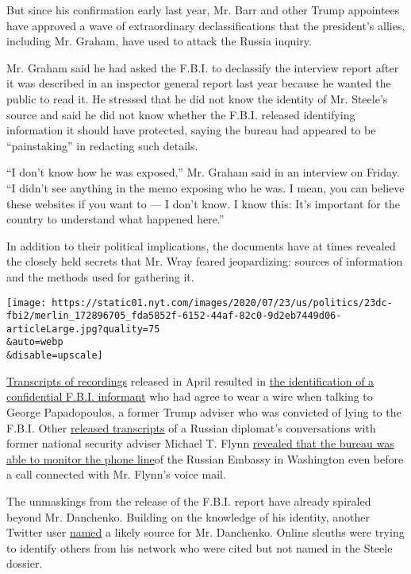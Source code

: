 But since his confirmation early last year, Mr. Barr and other Trump
appointees have approved a wave of extraordinary declassifications that
the president's allies, including Mr. Graham, have used to attack the
Russia inquiry.

Mr. Graham said he had asked the F.B.I. to declassify the interview
report after it was described in an inspector general report last year
because he wanted the public to read it. He stressed that he did not
know the identity of Mr. Steele's source and said he did not know
whether the F.B.I. released identifying information it should have
protected, saying the bureau had appeared to be ``painstaking'' in
redacting such details.

``I don't know how he was exposed,'' Mr. Graham said in an interview on
Friday. ``I didn't see anything in the memo exposing who he was. I mean,
you can believe these websites if you want to --- I don't know. I know
this: It's important for the country to understand what happened here.''

In addition to their political implications, the documents have at times
revealed the closely held secrets that Mr. Wray feared jeopardizing:
sources of information and the methods used for gathering it.

\texttt{[image: https://static01.nyt.com/images/2020/07/23/us/politics/23dc-fbi2/merlin\_172896705\_fda5852f-6152-44af-82c0-9d2eb7449d06-articleLarge.jpg?quality=75\\\&auto=webp\\\&disable=upscale]}

\href{https://www.judiciary.senate.gov/imo/media/doc/2020-04-24\%20Submission\%20SJC\%20SSCI.pdf}{Transcripts
of recordings} released in April resulted in
\href{https://dailycaller.com/2020/05/06/george-papadopoulos-fbi-informant-transcript/}{the
identification of a confidential F.B.I. informant} who had agree to wear
a wire when talking to George Papadopoulos, a former Trump adviser who
was convicted of lying to the F.B.I. Other
\href{https://int.nyt.com/data/documenthelper/6976-flynn-kislyak-transcripts/cd9e96e708a9b0c8ba58/optimized/full.pdf\#page=1}{released
transcripts} of a Russian diplomat's conversations with former national
security adviser Michael T. Flynn
\href{https://www.nytimes.com/2020/05/29/us/politics/flynn-russian-ambassador-transcripts.html}{revealed
that the bureau was able to monitor the phone line}of the Russian
Embassy in Washington even before a call connected with Mr. Flynn's
voice mail.

The unmaskings from the release of the F.B.I. report have already
spiraled beyond Mr. Danchenko. Building on the knowledge of his
identity, another Twitter user
\href{https://twitter.com/FOOL_NELSON/status/1285347075048251392}{named}
a likely source for Mr. Danchenko. Online sleuths were trying to
identify others from his network who were cited but not named in the
Steele dossier.

